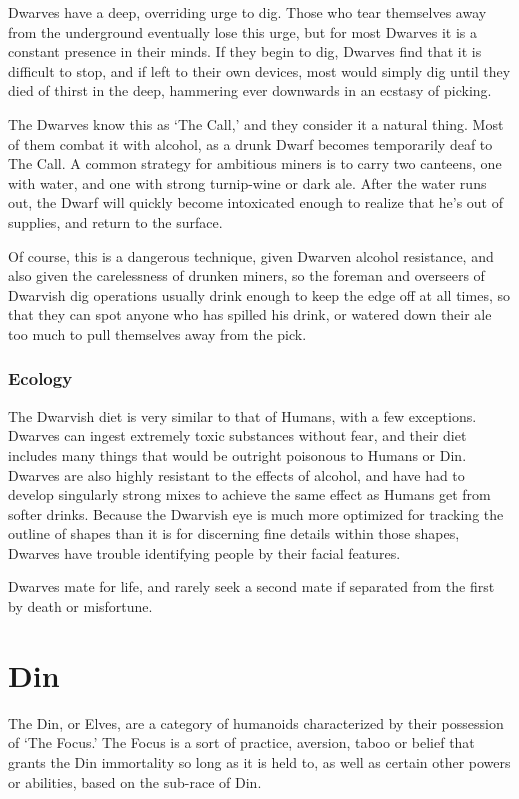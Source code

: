 \documentclass[oneside,11pt,english]{book}
\begin{document}
Dwarves have a deep, overriding urge to dig. Those who tear themselves away from
the underground eventually lose this urge, but for most Dwarves it is a constant
presence in their minds. If they begin to dig, Dwarves find that it is difficult
to stop, and if left to their own devices, most would simply dig until they died
of thirst in the deep, hammering ever downwards in an ecstasy of picking.

The Dwarves know this as ‘The Call,’ and they consider it a natural thing. Most
of them combat it with alcohol, as a drunk Dwarf becomes temporarily deaf to The
Call. A common strategy for ambitious miners is to carry two canteens, one with
water, and one with strong turnip-wine or dark ale. After the water runs out,
the Dwarf will quickly become intoxicated enough to realize that he's out of
supplies, and return to the surface.

Of course, this is a dangerous technique, given Dwarven alcohol resistance, and
also given the carelessness of drunken miners, so the foreman and overseers of
Dwarvish dig operations usually drink enough to keep the edge off at all times,
so that they can spot anyone who has spilled his drink, or watered down their
ale too much to pull themselves away from the pick.
\subsubsection*{Ecology} 
The Dwarvish diet is very similar to that of Humans, with a few exceptions.
Dwarves can ingest extremely toxic substances without fear, and their diet
includes many things that would be outright poisonous to Humans or Din. Dwarves
are also highly resistant to the effects of alcohol, and have had to develop
singularly strong mixes to achieve the same effect as Humans get from softer
drinks. Because the Dwarvish eye is much more optimized for tracking the outline
of shapes than it is for discerning fine details within those shapes, Dwarves
have trouble identifying people by their facial features.

Dwarves mate for life, and rarely seek a second mate if separated from the first
by death or misfortune.
\section{Din}%
The Din, or Elves, are a category of humanoids characterized by their possession
of ‘The Focus.’ The Focus is a sort of practice, aversion, taboo or belief that
grants the Din immortality so long as it is held to, as well as certain other
powers or abilities, based on the sub-race of Din.
\end{document}
